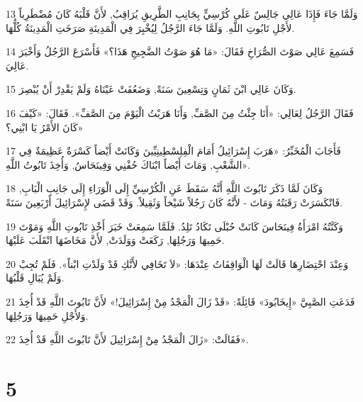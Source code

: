 \par 13 وَلَمَّا جَاءَ فَإِذَا عَالِي جَالِسٌ عَلَى كُرْسِيٍّ بِجَانِبِ الطَّرِيقِ يُرَاقِبُ, لأَنَّ قَلْبَهُ كَانَ مُضْطَرِباً لأَجْلِ تَابُوتِ اللَّهِ. وَلَمَّا جَاءَ الرَّجُلُ لِيُخْبِرَ فِي الْمَدِينَةِ صَرَخَتِ الْمَدِينَةُ كُلُّهَا.
\par 14 فَسَمِعَ عَالِي صَوْتَ الصُّرَاخِ فَقَالَ: «مَا هُوَ صَوْتُ الضَّجِيجِ هَذَا؟» فَأَسْرَعَ الرَّجُلُ وَأَخْبَرَ عَالِيَ.
\par 15 وَكَانَ عَالِي ابْنَ ثَمَانٍ وَتِسْعِينَ سَنَةً, وَضَعُفَتْ عَيْنَاهُ وَلَمْ يَقْدِرْ أَنْ يُبْصِرَ.
\par 16 فَقَالَ الرَّجُلُ لِعَالِي: «أَنَا جِئْتُ مِنَ الصَّفِّ, وَأَنَا هَرَبْتُ الْيَوْمَ مِنَ الصَّفِّ». فَقَالَ: «كَيْفَ كَانَ الأَمْرُ يَا ابْنِي؟»
\par 17 فَأَجَابَ الْمُخَبِّرُ: «هَرَبَ إِسْرَائِيلُ أَمَامَ الْفِلِسْطِينِيِّينَ وَكَانَتْ أَيْضاً كَسْرَةٌ عَظِيمَةٌ فِي الشَّعْبِ, وَمَاتَ أَيْضاً ابْنَاكَ حُفْنِي وَفِينَحَاسُ, وَأُخِذَ تَابُوتُ اللَّهِ».
\par 18 وَكَانَ لَمَّا ذَكَرَ تَابُوتَ اللَّهِ أَنَّهُ سَقَطَ عَنِ الْكُرْسِيِّ إِلَى الْوَرَاءِ إِلَى جَانِبِ الْبَابِ, فَانْكَسَرَتْ رَقَبَتُهُ وَمَاتَ - لأَنَّهُ كَانَ رَجُلاً شَيْخاً وَثَقِيلاً. وَقَدْ قَضَى لإِسْرَائِيلَ أَرْبَعِينَ سَنَةً.
\par 19 وَكَنَّتُهُ امْرَأَةُ فِينَحَاسَ كَانَتْ حُبْلَى تَكَادُ تَلِدُ. فَلَمَّا سَمِعَتْ خَبَرَ أَخْذِ تَابُوتِ اللَّهِ وَمَوْتَ حَمِيهَا وَرَجُلِهَا, رَكَعَتْ وَوَلَدَتْ, لأَنَّ مَخَاضَهَا انْقَلَبَ عَلَيْهَا.
\par 20 وَعِنْدَ احْتِضَارِهَا قَالَتْ لَهَا الْوَاقِفَاتُ عِنْدَهَا: «لاَ تَخَافِي لأَنَّكِ قَدْ وَلَدْتِ ابْناً». فَلَمْ تُجِبْ وَلَمْ يُبَالِ قَلْبُهَا.
\par 21 فَدَعَتِ الصَّبِيَّ «إِيخَابُودَ» قَائِلَةً: «قَدْ زَالَ الْمَجْدُ مِنْ إِسْرَائِيلَ!» لأَنَّ تَابُوتَ اللَّهِ قَدْ أُخِذَ وَلأَجْلِ حَمِيهَا وَرَجُلِهَا.
\par 22 فَقَالَتْ: «زَالَ الْمَجْدُ مِنْ إِسْرَائِيلَ لأَنَّ تَابُوتَ اللَّهِ قَدْ أُخِذَ».

\chapter{5}

